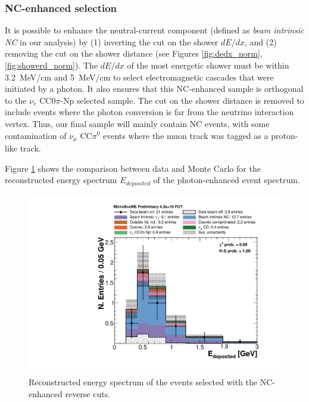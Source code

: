 \subsubsection{NC-enhanced selection}
It is possible to enhance the neutral-current component (defined as \emph{beam intrinsic NC} in our analysis) by (1) inverting the cut on the shower $dE/dx$, and (2) removing the cut on the shower distance (see Figures \ref{fig:dedx_norm}, \ref{fig:showerd_norm}). The $dE/dx$ of the most energetic shower must be within 3.2~MeV/cm and 5~MeV/cm to select electromagnetic cascades that were initiated by a photon. It also ensures that this NC-enhanced sample is orthogonal to the $\nu_{e}$ CC0$\pi$-Np selected sample. The cut on the shower distance is removed to include events where the photon conversion is far from the neutrino interaction vertex.
Thus, our final sample will mainly contain NC events, with some contamination of $\nu_{\mu}$ CC$\pi^{0}$ events where the muon track was tagged as a proton-like track.

Figure \ref{fig:photon} shows the comparison between data and Monte Carlo for the reconstructed energy spectrum $E_{deposited}$ of the photon-enhanced event spectrum. 

\begin{figure}[htbp]
\centering
  \includegraphics[width=0.7\linewidth]{figures/nc_reco.pdf}
  \caption{Reconstructed energy spectrum of the events selected with the NC-enhanced reverse cuts.}\label{fig:photon}
\end{figure}

